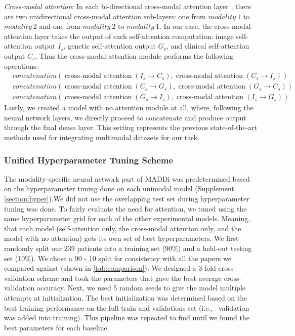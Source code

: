 \documentclass[11pt]{article}
\begin{document}
\textit{Cross-modal attention}: In each bi-directional cross-modal attention layer \cite{Tan2019LXMERTLC}, there are two unidirectional cross-modal attention sub-layers: one from $modality\ 1$ to $modality\ 2$ and one from $modality\ 2$ to $modality\ 1$. In our case, the cross-modal attention layer takes the output of each self-attention computation: image self-attention output $I_s$, genetic self-attention output $G_s$, and clinical self-attention output $C_s$. Thus the cross-modal attention module performs the following operations:
  \begin{align}
    &concatenation(\operatorname{cross-modal\ attention}( I_s \rightarrow C_s), \operatorname{cross-modal \ attention}( C_s \rightarrow I_s))\\
    &concatenation(\operatorname{cross-modal \ attention}( C_s \rightarrow G_s), \operatorname{cross-modal \ attention}( G_s \rightarrow C_s))\\
    &concatenation(\operatorname{cross-modal \ attention}( G_s \rightarrow I_s), \operatorname{cross-modal \ attention}( I_s \rightarrow G_s))
  \end{align}
Lastly, we created a model with no attention module at all, where, following the neural network layers, we directly proceed to concatenate and produce output through the final dense layer. This setting represents the previous state-of-the-art methods used for integrating multimodal datasets for our task. 



\subsubsection*{Unified Hyperparameter Tuning Scheme}
The modality-specific neural network part of MADDi was predetermined based on the hyperparameter tuning done on each unimodal model (Supplement \ref{section:hyper}).We did not use the overlapping test set during hyperparameter tuning was done. To fairly evaluate the need for attention, we tuned using the same hyperparameter grid for each of the other experimental models. Meaning, that each model (self-attention only, the cross-modal attention only, and the model with no attention) gets its own set of best hyperparameters. 
We first randomly split our 239 patients into a training set (90\%) and a held-out testing set (10\%). We chose a 90 - 10 split for consistency with all the papers we compared against (shown in \ref{tab:comparison}). We designed a 3-fold cross-validation scheme and took the parameters that gave the best average cross-validation accuracy. Next, we used 5 random seeds to give the model multiple attempts at initialization. The best initialization was determined based on the best training performance on the full train and validations set (i.e., \ validation was added into training). This pipeline was repeated to find until we found the best parameters for each baseline. 
\end{document}
